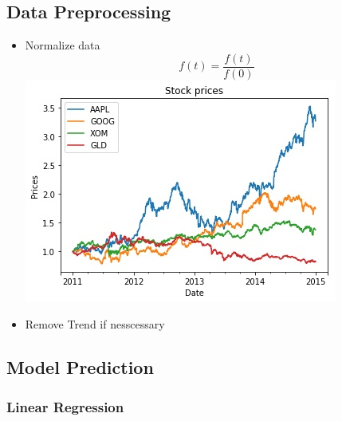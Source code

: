 \documentclass[11pt]{article}
\makeatletter
\def\maxwidth{\ifdim\Gin@nat@width>\linewidth\linewidth
    \else\Gin@nat@width\fi}
\let\Oldincludegraphics\includegraphics
\renewcommand{\includegraphics}[1]{\Oldincludegraphics[width=.8\maxwidth]{#1}}
\makeatother
\begin{document}
\subsection{Data Preprocessing}\label{data-preprocessing}

\begin{itemize}
\item
  Normalize data \[f(t) = \frac{f(t)}{f(0)}\]
  \includegraphics{./figures/4.jpg}
\item
  Remove Trend if nesscessary
\end{itemize}

\subsection{Model Prediction}\label{model-prediction}

\subsubsection{Linear Regression}\label{linear-regression}
\end{document}
